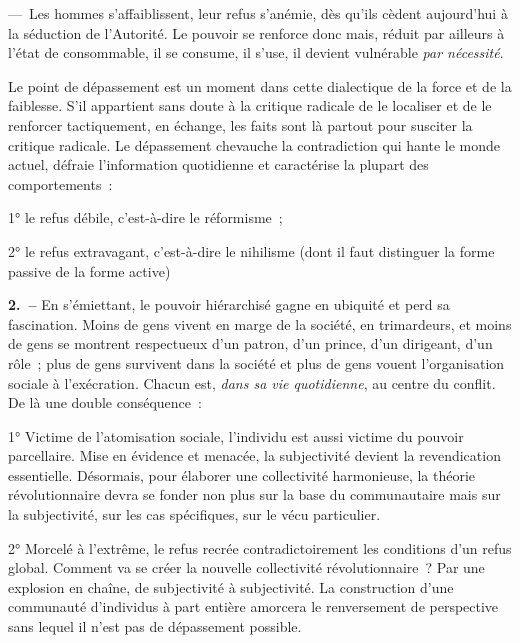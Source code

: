 \documentclass[french,twoside]{book} %
\newcommand{\labelchar}[1]{\textbf{\color{rubric} #1}}
\begin{document}
— Les hommes s’affaiblissent, leur refus s’anémie, dès qu’ils cèdent aujourd’hui à la séduction de l’Autorité. Le pouvoir se renforce donc mais, réduit par ailleurs à l’état de consommable, il se consume, il s’use, il devient vulnérable \emph{par nécessité}.\par
Le point de dépassement est un moment dans cette dialectique de la force et de la faiblesse. S’il appartient sans doute à la critique radicale de le localiser et de le renforcer tactiquement, en échange, les faits sont là partout pour susciter la critique radicale. Le dépassement chevauche la contradiction qui hante le monde actuel, défraie l’information quotidienne et caractérise la plupart des comportements :\par
1° le refus débile, c’est-à-dire le réformisme ;\par
2° le refus extravagant, c’est-à-dire le nihilisme (dont il faut distinguer la forme passive de la forme active)\par
\labelchar{2. –} En s’émiettant, le pouvoir hiérarchisé gagne en ubiquité et perd sa fascination. Moins de gens vivent en marge de la société, en trimardeurs, et moins de gens se montrent respectueux d’un patron, d’un prince, d’un dirigeant, d’un rôle ; plus de gens survivent dans la société et plus de gens vouent l’organisation sociale à l’exécration. Chacun est, \emph{dans sa vie quotidienne}, au centre du conflit. De là une double conséquence :\par
1° Victime de l’atomisation sociale, l’individu est aussi victime du pouvoir parcellaire. Mise en évidence et menacée, la subjectivité devient la revendication essentielle. Désormais, pour élaborer une collectivité harmonieuse, la théorie révolutionnaire devra se fonder non plus sur la base du communautaire mais sur la subjectivité, sur les cas spécifiques, sur le vécu particulier.\par
2° Morcelé à l’extrême, le refus recrée contradictoirement les conditions d’un refus global. Comment va se créer la nouvelle collectivité révolutionnaire ? Par une explosion en chaîne, de subjectivité à subjectivité. La construction d’une communauté d’individus à part entière amorcera le renversement de perspective sans lequel il n’est pas de dépassement possible.\par
\end{document}
